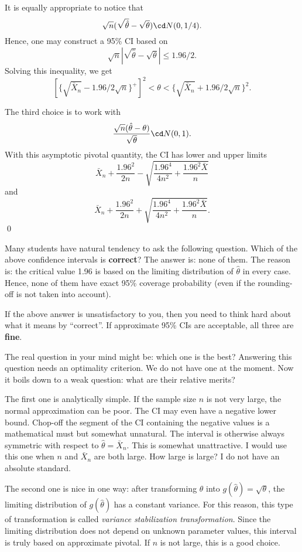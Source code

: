 It is equally appropriate to notice that
\[
\sqrt{n}( \sqrt{\hat \theta} - \sqrt{ \theta}) \cd N(0, 1/4).
\]
Hence, one may construct a 95\% CI based on
\[
\sqrt{n}| \sqrt{\hat \theta} - \sqrt{ \theta}| \leq 1.96/2.
\]
Solving this inequality, we get
\[
[ \{\sqrt{ \bar X_n} - 1.96/2\sqrt{n} \}^+]^2 < \theta < \{ \sqrt{\bar X_n} + 1.96/2\sqrt{n} \}^2.
\]

The third choice is to work with
\[
\frac{\sqrt{n}({\hat \theta} - { \theta})}{\sqrt{\theta}} \cd N(0, 1).
\]
With this asymptotic pivotal quantity, the CI has lower and upper limits
\[
\bar X_n +  \frac{1.96^2}{2n} -\sqrt{ \frac{1.96^4}{4n^2} + \frac{1.96^2\bar X}{n}}
\]
and
\[
\bar X_n +  \frac{1.96^2}{2n} +\sqrt{ \frac{1.96^4}{4n^2} + \frac{1.96^2\bar X}{n}}.
\]
\qed

\vs\vs

Many students have natural tendency to ask the following question.
Which of the above confidence intervals is {\bf correct}? The answer is: none of
them. The reason is: the critical value 1.96 is based on the limiting distribution
of $\hat \theta$ in every case. Hence, none of them have exact 95\%
coverage probability (even if the rounding-off is not taken into account).

If the above answer is unsatisfactory to you, then you need to think hard
about what it means by ``correct''. If approximate 95\% CIs are acceptable,
all three are {\bf fine}. 

The real question in your mind might be: which one is the best? 
Answering this question needs an optimality criterion. We do not have one
at the moment.
Now it boils down to a weak question: what are their relative merits?

The first one is analytically simple. If the sample size $n$ is not very large,
the normal approximation can be poor. The CI may even have a negative
lower bound. Chop-off the segment of the CI containing the negative values
is a mathematical must but somewhat unnatural.  
The interval is otherwise always symmetric with respect to 
$\hat \theta = \bar X_n$.
This is somewhat unattractive. I would use this one when $n$ and $\bar X_n$
are both large. How large is large? I do not have an absolute standard.

The second one is nice in one way: after transforming $ \theta$ into 
$g(\hat \theta)=\sqrt{\theta}$,
the limiting distribution of $g(\hat \theta)$ has a constant 
variance. For this reason, this type of transformation is called 
{\it variance stabilization transformation}.
Since the limiting distribution does not depend on unknown parameter values,
this interval is truly based on approximate pivotal.
If $n$ is not large, this is a good choice.

